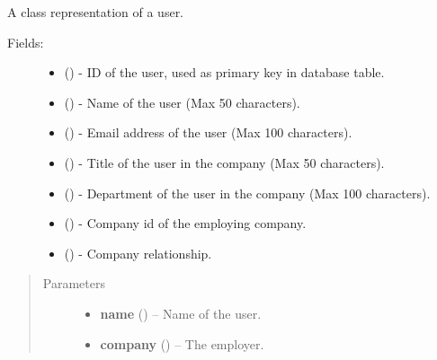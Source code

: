 \documentclass[letterpaper,10pt,english]{sphinxmanual}
\begin{document}
\begin{fulllineitems}
\label{models:models.User}
A class representation of a user.
\begin{description}
\item[{Fields:}] \leavevmode\begin{itemize}
\item {} 
        ()        - ID of the user, used as primary key in database table.

\item {} 
        ()        - Name of the user (Max 50 characters).

\item {} 
        ()        - Email address of the user (Max 100 characters).

\item {} 
        ()        - Title of the user in the company (Max 50 characters).

\item {} 
        ()        - Department of the user in the company (Max 100 characters).

\item {} 
        ()        - Company id of the employing company.

\item {} 
 ()        - Company relationship.

\end{itemize}

\end{description}
\begin{quote}\begin{description}
\item[{Parameters}] \leavevmode\begin{itemize}
\item {} 
\textbf{name} () -- Name of the user.

\item {} 
\textbf{company} ({\hyperref[models:models.Company]{}}) -- The employer.

\end{itemize}

\end{description}\end{quote}

\end{fulllineitems}
\end{document}
